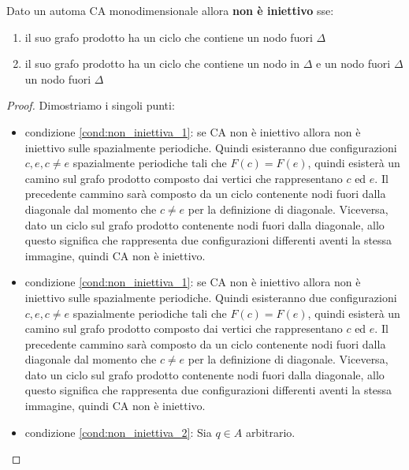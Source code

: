 \begin{teorema}
    Dato un automa CA monodimensionale allora \textbf{non è iniettivo} sse:
    \begin{enumerate}
        \item \label{cond:non_iniettiva_1} il suo grafo prodotto ha un ciclo che contiene un nodo fuori $\Delta$
        \item \label{cond:non_iniettiva_2}il suo grafo prodotto ha un ciclo che contiene un nodo in $\Delta$ e
              un nodo fuori $\Delta$
              un nodo fuori $\Delta$
    \end{enumerate}
    \begin{proof}
        Dimostriamo i singoli punti:
        \begin{itemize}
            \item condizione \ref{cond:non_iniettiva_1}: se CA non è iniettivo
                  allora non è iniettivo sulle spazialmente periodiche. Quindi esisteranno
                  due configurazioni $c,e, c\ne e$ spazialmente periodiche tali che $F(c) = F(e)$,
                  quindi esisterà un camino sul grafo prodotto composto dai vertici che
                  rappresentano $c$ ed $e$. Il precedente cammino sarà composto da un ciclo
                  contenente nodi fuori dalla diagonale dal momento che $c\ne e$ per la
                  definizione di diagonale. Viceversa, dato un ciclo sul grafo prodotto contenente nodi
                  fuori dalla diagonale, allo questo significa che rappresenta due
                  configurazioni differenti aventi la stessa immagine, quindi CA non è
                  iniettivo.
            \item condizione \ref{cond:non_iniettiva_1}: se CA non è iniettivo
                  allora non è iniettivo sulle spazialmente periodiche. Quindi esisteranno
                  due configurazioni $c,e, c\ne e$ spazialmente periodiche tali che $F(c) = F(e)$,
                  quindi esisterà un camino sul grafo prodotto composto dai vertici che
                  rappresentano $c$ ed $e$. Il precedente cammino sarà composto da un ciclo
                  contenente nodi fuori dalla diagonale dal momento che $c\ne e$ per la
                  definizione di diagonale. Viceversa, dato un ciclo sul grafo prodotto contenente nodi
                  fuori dalla diagonale, allo questo significa che rappresenta due
                  configurazioni differenti aventi la stessa immagine, quindi CA non è
                  iniettivo.
            \item condizione \ref{cond:non_iniettiva_2}: Sia $q\in A$ arbitrario.

\end{itemize}
\end{proof}
\end{teorema}
